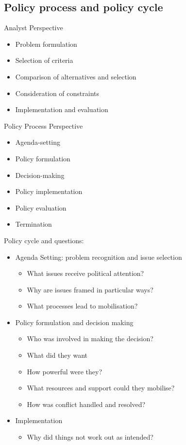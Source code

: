 \documentclass[12pt, letterpaper]{article}
\begin{document}
{\subsection{Policy process and policy cycle}
Analyst Perspective
\begin{itemize}
	\item Problem formulation
	\item Selection of criteria
	\item Comparison of alternatives and selection
	\item Consideration of constraints
	\item Implementation and evaluation
\end{itemize}
Policy Process Perspective
\begin{itemize}
	\item Agenda-setting
	\item Policy formulation
	\item Decision-making
	\item Policy implementation
	\item Policy evaluation
	\item Termination
\end{itemize}
Policy cycle and questions:
\begin{itemize}
	\item Agenda Setting: problem recognition and issue selection
		\begin{itemize}
			\item What issues receive political attention?
			\item Why are issues framed in particular ways?
			\item What processes lead to mobilisation?
		\end{itemize}
	\item Policy formulation and decision making
		\begin{itemize}
			\item Who was involved in making the decision?
			\item What did they want
			\item How powerful were they?
			\item What resources and support could they mobilise?
			\item How was conflict handled and resolved?
		\end{itemize}
	\item Implementation
		\begin{itemize}
			\item Why did things not work out as intended?

\end{itemize}
\end{itemize}}
\end{document}
